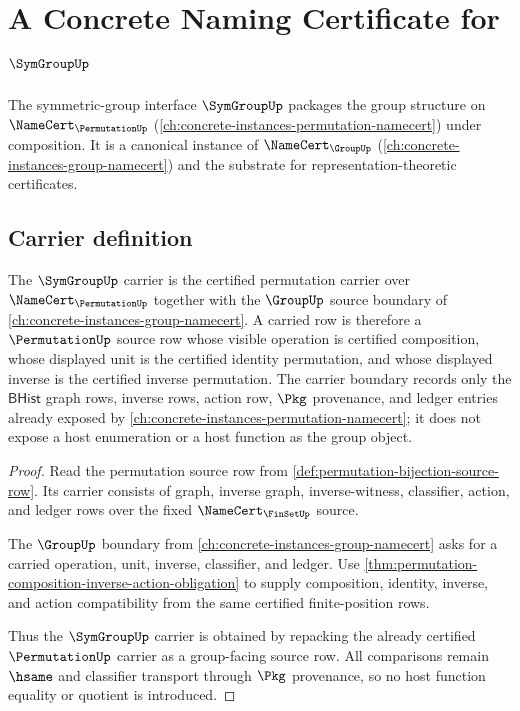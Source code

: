 \chapter{A Concrete Naming Certificate for $\SymGroupUp$}
\label{ch:concrete-instances-symgroup-namecert}

The symmetric-group interface $\SymGroupUp$ packages the group structure on $\NameCert_{\PermutationUp}$ (\autoref{ch:concrete-instances-permutation-namecert}) under composition. It is a canonical instance of $\NameCert_{\GroupUp}$ (\autoref{ch:concrete-instances-group-namecert}) and the substrate for representation-theoretic certificates.

\section{Carrier definition}
\label{sec:symgroup-carrier}

\begin{theorem}
\label{thm:symgroup-carrier-obligation}
The $\SymGroupUp$ carrier is the certified permutation carrier over
$\NameCert_{\PermutationUp}$ together with the $\GroupUp$ source boundary of
\autoref{ch:concrete-instances-group-namecert}. A carried row is therefore a
$\PermutationUp$ source row whose visible operation is certified composition,
whose displayed unit is the certified identity permutation, and whose displayed
inverse is the certified inverse permutation. The carrier boundary records only
the $\mathsf{BHist}$ graph rows, inverse rows, action row, $\Pkg$ provenance,
and ledger entries already exposed by \autoref{ch:concrete-instances-permutation-namecert};
it does not expose a host enumeration or a host function as the group object.
\end{theorem}
\begin{proof}
Read the permutation source row from \autoref{def:permutation-bijection-source-row}.
Its carrier consists of graph, inverse graph, inverse-witness, classifier,
action, and ledger rows over the fixed $\NameCert_{\FinSetUp}$ source.

The $\GroupUp$ boundary from \autoref{ch:concrete-instances-group-namecert}
asks for a carried operation, unit, inverse, classifier, and ledger. Use
\autoref{thm:permutation-composition-inverse-action-obligation} to supply
composition, identity, inverse, and action compatibility from the same certified
finite-position rows.

Thus the $\SymGroupUp$ carrier is obtained by repacking the already certified
$\PermutationUp$ carrier as a group-facing source row. All comparisons remain
$\hsame$ and classifier transport through $\Pkg$ provenance, so no host
function equality or quotient is introduced.
\end{proof}

